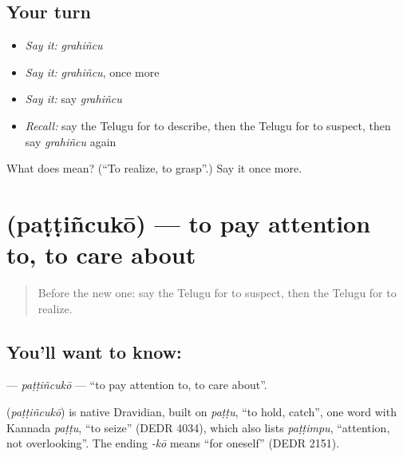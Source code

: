 \subsection*{Your turn}
\begin{itemize}
\raggedright
  \item \emph{Say it:} \emph{grahiñcu}
  \item \emph{Say it:} \emph{grahiñcu}, once more
  \item \emph{Say it:} say \emph{grahiñcu}
  \item \emph{Recall:} say the Telugu for to describe, then the Telugu for to suspect, then say \emph{grahiñcu} again
\end{itemize}

\begin{tcolorbox}[breakable,colback=teal!4,colframe=teal!35!black,title={Before you move on}]
What does  mean? (\textquotedblleft{}To realize, to grasp\textquotedblright{}.) Say it once more.
\end{tcolorbox}
\section[\texorpdfstring{\te{పట్టించుకో} (paṭṭiñcukō)}{పట్టించుకో (paṭṭiñcukō)}]{ (paṭṭiñcukō) — to pay attention to, to care about}

\label{lesson:TE-C163-pattincuko}



\begin{quote}
Before the new one: say the Telugu for to suspect, then the Telugu for to realize.
\end{quote}

\subsection*{You'll want to know: }
\textbf{} — \emph{paṭṭiñcukō} — \textquotedblleft{}to pay attention to, to care about\textquotedblright{}.

\begin{cousinweb}
\textbf{} (\emph{paṭṭiñcukō}) is native Dravidian, built on \emph{paṭṭu}, \textquotedblleft{}to hold, catch\textquotedblright{}, one word with Kannada \emph{paṭṭu}, \textquotedblleft{}to seize\textquotedblright{} (DEDR 4034), which also lists \emph{paṭṭimpu}, \textquotedblleft{}attention, not overlooking\textquotedblright{}. The ending \emph{-kō} means \textquotedblleft{}for oneself\textquotedblright{} (DEDR 2151).
\end{cousinweb}

